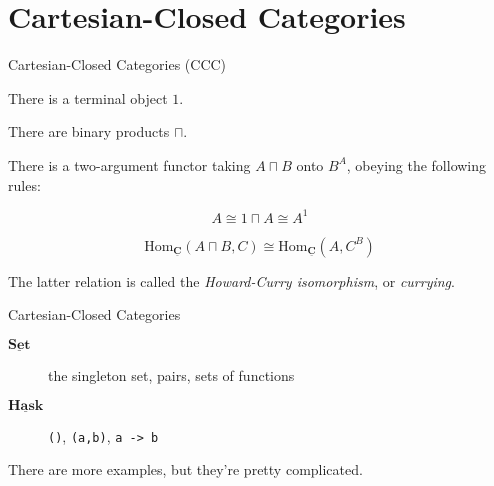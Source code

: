 \documentclass[10pt]{beamer}
\newcommand{\Cat}[1]{\ensuremath{\underline{\mathbf{#1}}}}
\newcommand{\Hom}[3]{\ensuremath{\mathrm{Hom}_{\Cat{#1}}(#2,#3)}}
\newcommand{\Com}[3]{#3^{#2}}
\newcommand{\eqnlabel}[1]{\label{eq:#1}}
\theoremstyle{definition}
\theoremstyle{remark}
\numberwithin{equation}{section}
\begin{document}
\section{Cartesian-Closed Categories}

\begin{frame}[fragile]{Cartesian-Closed Categories (CCC)}

  There is a terminal object $1$.

  There are binary products $\sqcap$.

  There is a two-argument functor taking $A \sqcap B$ onto $\Com{C}{A}{B}$, obeying the following rules:
  
  \[
    A \cong 1 \sqcap A \cong \Com{C}{1}{A}
  \]
  
  \begin{equation}
  \Hom{C}{A\sqcap B}{C} \cong \Hom{C}{A}{\Com{C}{B}{C}} \eqnlabel{exp1}
  \end{equation}

  The latter relation is called the \emph{Howard-Curry isomorphism}, or \emph{currying}.
\end{frame}

\begin{frame}[fragile]{Cartesian-Closed Categories}

  \begin{description}
    \item[\Cat{Set}] the singleton set, pairs, sets of functions
    \item[\Cat{Hask}] \lstinline{()}, \lstinline{(a,b)}, \lstinline{a -> b}
  \end{description}

  There are more examples, but they're pretty complicated.

\end{frame}


  
\end{document}
